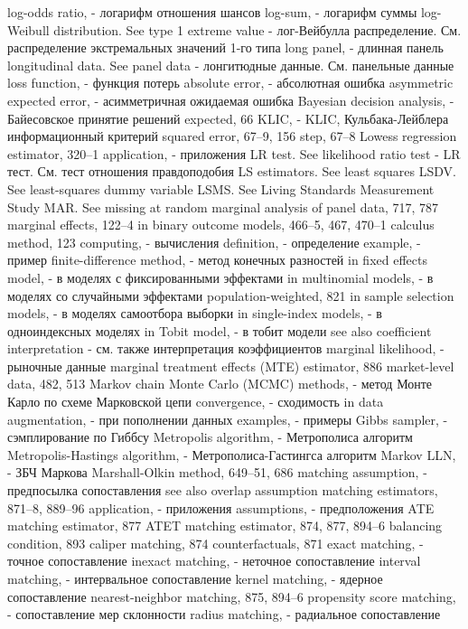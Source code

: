 log-odds ratio, - логарифм отношения шансов
log-sum, - логарифм суммы
log-Weibull distribution. See type 1 extreme value - лог-Вейбулла распределение. См. распределение экстремальных значений 1-го типа
long panel, - длинная панель
longitudinal data. See panel data - лонгитюдные данные. См. панельные данные
loss function, - функция потерь
absolute error, - абсолютная ошибка
asymmetric expected error, - асимметричная ожидаемая ошибка
Bayesian decision analysis, - Байесовское принятие решений
expected, 66
KLIC, - KLIC, Кульбака-Лейблера информационный критерий 
squared error, 67–9, 156
step, 67–8
Lowess regression estimator, 320–1 
application, - приложения
LR test. See likelihood ratio test - LR тест. См. тест отношения правдоподобия
LS estimators. See least squares
LSDV. See least-squares dummy variable
LSMS. See Living Standards Measurement Study
MAR. See missing at random
marginal analysis of panel data, 717, 787 marginal effects, 122–4
in binary outcome models, 466–5, 467, 470–1 calculus method, 123
computing, - вычисления
definition, - определение
example, - пример
finite-difference method, - метод конечных разностей
in fixed effects model, - в моделях с фиксированными эффектами
in multinomial models, - в моделях со случайными эффектами
population-weighted, 821
in sample selection models, - в моделях самоотбора выборки
in single-index models, - в одноиндексных моделях
in Tobit model, - в тобит модели
see also coefficient interpretation - см. также интерпретация коэффициентов
marginal likelihood, - рыночные данные
marginal treatment effects (MTE) estimator, 886 
market-level data, 482, 513
Markov chain Monte Carlo (MCMC) methods, - метод Монте Карло по схеме Марковской цепи
convergence, - сходимость
in data augmentation, - при пополнении данных
examples, - примеры
Gibbs sampler, - сэмплирование по Гиббсу 
Metropolis algorithm, - Метрополиса алгоритм 
Metropolis-Hastings algorithm, - Метрополиса-Гастингса алгоритм 
Markov LLN, - ЗБЧ Маркова 
Marshall-Olkin method, 649–51, 686 
matching assumption, - предпосылка сопоставления
see also overlap assumption matching estimators, 871–8, 889–96
application, - приложения
assumptions, - предположения
ATE matching estimator, 877
ATET matching estimator, 874, 877, 894–6 balancing condition, 893
caliper matching, 874
counterfactuals, 871
exact matching, - точное сопоставление
inexact matching, - неточное сопоставление
interval matching, - интервальное сопоставление
kernel matching, - ядерное сопоставление
nearest-neighbor matching, 875, 894–6 
propensity score matching, - сопоставление мер склонности
radius matching, - радиальное сопоставление
